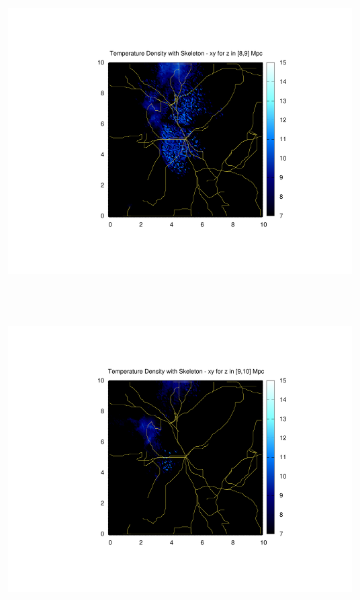 \documentclass[journal]{IEEEtran}
\begin{document}
\begin{figure}[!t]
\begin{subfigure}[t]{0.3\textwidth}
		\includegraphics[width=\linewidth]{TempDenSkel09.pdf}
	\end{subfigure}
	\\
	\begin{subfigure}[t]{0.3\textwidth}
		\centering
		\includegraphics[width=\linewidth]{TempDenSkel10.pdf}
	\end{subfigure}
	\quad
	\begin{subfigure}[t]{0.3\textwidth}
		\centering

\end{subfigure}
\end{figure}
\end{document}
